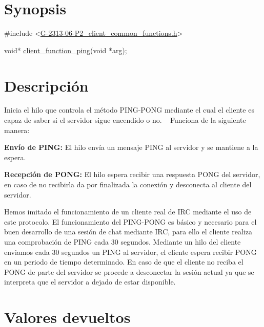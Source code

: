\hypertarget{client_function_ping_synopsis_1}{}\section{Synopsis}\label{client_function_ping_synopsis_1}

\begin{DoxyCode}
\textcolor{preprocessor}{#include <\hyperlink{G-2313-06-P2__client__common__functions_8h}{G-2313-06-P2\_client\_common\_functions.h}>}

\textcolor{keywordtype}{void}* \hyperlink{G-2313-06-P2__client_8h_a7297f848d5b0bd4990857d03cf3111e4}{client\_function\_ping}(\textcolor{keywordtype}{void} *arg);
\end{DoxyCode}
 \hypertarget{client_function_ping_descripcion_1}{}\section{Descripción}\label{client_function_ping_descripcion_1}
Inicia el hilo que controla el método P\+I\+N\+G-\/\+P\+O\+NG mediante el cual el cliente es capaz de saber si el servidor sigue encendido o no. ~\newline
Funciona de la siguiente manera\+: 
\begin{DoxyItemize}
\item {\bfseries Envío de P\+I\+NG\+:} El hilo envía un mensaje P\+I\+NG al servidor y se mantiene a la espera. 
\item {\bfseries Recepción de P\+O\+NG\+:} El hilo espera recibir una respuesta P\+O\+NG del servidor, en caso de no recibirla da por finalizada la conexión y desconecta al cliente del servidor. 
\end{DoxyItemize}Hemos imitado el funcionamiento de un cliente real de I\+RC mediante el uso de este protocolo. El funcionamiento del P\+I\+N\+G-\/\+P\+O\+NG es básico y necesario para el buen desarrollo de una sesión de chat mediante I\+RC, para ello el cliente realiza una comprobación de P\+I\+NG cada 30 segundos. Mediante un hilo del cliente enviamos cada 30 segundos un P\+I\+NG al servidor, el cliente espera recibir P\+O\+NG en un periodo de tiempo determinado. En caso de que el cliente no reciba el P\+O\+NG de parte del servidor se procede a desconectar la sesión actual ya que se interpreta que el servidor a dejado de estar disponible. \hypertarget{client_function_ping_return_1}{}\section{Valores devueltos}\label{client_function_ping_return_1}

